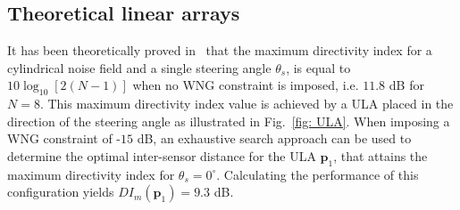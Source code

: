 \documentclass[9pt]{article}
\begin{document}
\subsection{Theoretical linear arrays}
\label{sec: linarray}
\vspace{-0.2cm}
It has been theoretically proved in~\cite{Elkobook} that the maximum directivity index for a cylindrical noise field and a single steering angle $\theta_{s}$, is equal to $10 \log_{10} \left[2(N-1) \right]$ when no WNG constraint is imposed, i.e. $11.8$ dB for $N=8$. This maximum directivity index value is achieved by a ULA placed in the direction of the steering angle as illustrated in Fig.~{\ref{fig: ULA}}. When imposing a WNG constraint of -$15$ dB, an exhaustive search approach can be used to determine the optimal inter-sensor distance for the ULA $\mathbf{p}_1$, that attains the maximum directivity index for $\theta_s = 0^{\circ}$. Calculating the performance of this configuration yields $DI_{m}(\mathbf{p}_1) = 9.3$ dB.
\end{document}
